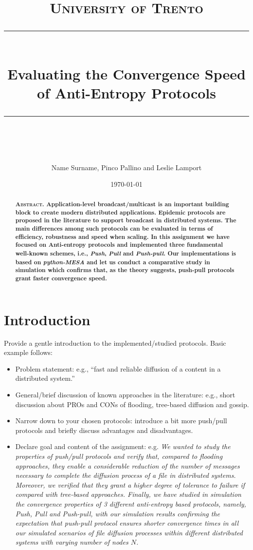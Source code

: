 \documentclass[11pt]{scrartcl} %
\title{	
	\normalfont\normalsize
	\textsc{University of Trento}\\ %
	\vspace{25pt} %
	\rule{\linewidth}{0.5pt}\\ %
	\vspace{20pt} %
	{\huge Evaluating the Convergence Speed of Anti-Entropy Protocols}\\ %
	\vspace{12pt} %
	\rule{\linewidth}{2pt}\\ %
	\vspace{12pt} %
}
\author{\LARGE Name Surname, Pinco Pallino and Leslie Lamport} %
\date{\normalsize\today} %
\begin{document}
\maketitle %


\begin{abstract}
\bfseries
%
\textsc{Abstract.} Application-level broadcast/multicast is an important building
block to create modern distributed applications. 
% 
Epidemic protocols are proposed in the literature to support broadcast in distributed systems.
The main differences among such protocols can be evaluated in terms of efficiency, robustness and speed when scaling.
In this assignment we have focused on Anti-entropy protocols and implemented three fundamental well-known schemes, i.e.,
\textit{Push}, \textit{Pull} and \textit{Push-pull}. Our implementations is based on \textit{python-MESA}
and let us conduct a comparative study in
simulation which confirms that, as the theory suggests, push-pull protocols grant faster convergence speed.
\end{abstract}

\section{Introduction}

Provide a gentle introduction to the implemented/studied protocols. Basic example follows:
\begin{itemize}
  \item Problem statement: e.g., ``fast and reliable diffusion of a content in a distributed system.''
  \item General/brief discussion of known approaches in the literature: e.g., short discussion about PROs and CONs of flooding, tree-based diffusion and gossip.
  \item Narrow down to your chosen protocols: introduce a bit more push/pull protocols and briefly discuss advantages and disadvantages.
  \item Declare goal and content of the assignment: e.g. \emph{We wanted to study the properties of push/pull protocols and verify that,
  compared to flooding approaches, they enable a considerable reduction of the number of messages necessary to complete the diffusion
  process of a file in distributed systems. Moreover, we verified that they grant a higher degree of tolerance to failure if compared with tree-based approaches. Finally, we have studied in simulation the convergence properties of 3 different anti-entropy based protocols, namely, \textit{Push}, \textit{Pull} and \textit{Push-pull}, with our simulation results confirming the expectation that push-pull
  protocol ensures shorter convergence times in all our simulated scenarios of file diffusion processes within
  different distributed systems with varying number of nodes $N$.}   
\end{itemize}
\end{document}
